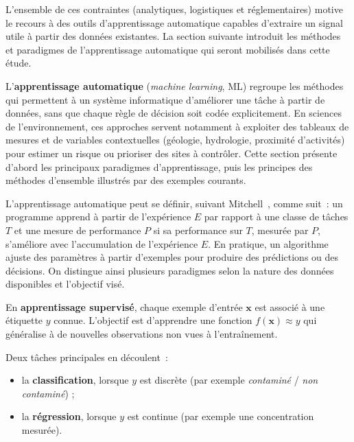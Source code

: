 L'ensemble de ces contraintes (analytiques, logistiques et r\'eglementaires) motive le recours \`a des outils d'apprentissage automatique capables d'extraire un signal utile \`a partir des donn\'ees existantes.
La section suivante introduit les m\'ethodes et paradigmes de l'apprentissage automatique qui seront mobilis\'es dans cette \'etude.

\label{sec:ml-ensemble}

L'\textbf{apprentissage automatique} (\emph{machine learning}, ML) regroupe les m\'ethodes qui permettent \`a un syst\`eme informatique d'am\'eliorer une t\^ache \`a partir de donn\'ees, sans que chaque r\`egle de d\'ecision soit cod\'ee explicitement.
En sciences de l'environnement, ces approches servent notamment \`a exploiter des tableaux de mesures et de variables contextuelles (g\'eologie, hydrologie, proximit\'e d'activit\'es) pour estimer un risque ou prioriser des sites \`a contr\^oler.
Cette section pr\'esente d'abord les principaux paradigmes d'apprentissage, puis les principes des m\'ethodes d'ensemble illustr\'es par des exemples courants.


\label{sec:ml-definition}

L'apprentissage automatique peut se d\'efinir, suivant Mitchell~\cite{mitchell1997ml}, comme suit~: un programme apprend \`a partir de l'exp\'erience $E$ par rapport \`a une classe de t\^aches $T$ et une mesure de performance $P$ si sa performance sur $T$, mesur\'ee par $P$, s'am\'eliore avec l'accumulation de l'exp\'erience $E$.
En pratique, un algorithme ajuste des param\`etres \`a partir d'exemples pour produire des pr\'edictions ou des d\'ecisions.
On distingue ainsi plusieurs paradigmes selon la nature des donn\'ees disponibles et l'objectif vis\'e.


\label{sec:ml-supervise}

En \textbf{apprentissage supervis\'e}, chaque exemple d'entr\'ee $\mathbf{x}$ est associ\'e \`a une \'etiquette $y$ connue.
L'objectif est d'apprendre une fonction $f(\mathbf{x}) \approx y$ qui g\'en\'eralise \`a de nouvelles observations non vues \`a l'entra\^inement.

Deux t\^aches principales en d\'ecoulent~:
\begin{itemize}
    \item la \textbf{classification}, lorsque $y$ est discr\`ete (par exemple \emph{contamin\'e} / \emph{non contamin\'e}) ;
    \item la \textbf{r\'egression}, lorsque $y$ est continue (par exemple une concentration mesur\'ee).
\end{itemize}

